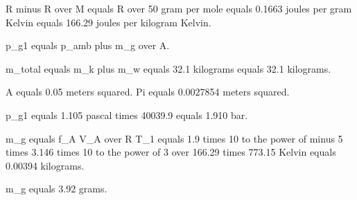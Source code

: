 R minus R over M equals R over 50 gram per mole equals 0.1663 joules per gram Kelvin equals 166.29 joules per kilogram Kelvin.

p_g1 equals p_amb plus m_g over A.

m_total equals m_k plus m_w equals 32.1 kilograms equals 32.1 kilograms.

A equals 0.05 meters squared. Pi equals 0.0027854 meters squared.

p_g1 equals 1.105 pascal times 40039.9 equals 1.910 bar.

m_g equals f_A V_A over R T_1 equals 1.9 times 10 to the power of minus 5 times 3.146 times 10 to the power of 3 over 166.29 times 773.15 Kelvin equals 0.00394 kilograms.

m_g equals 3.92 grams.